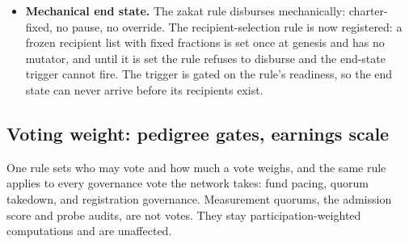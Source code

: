 \documentclass[11pt]{article}
\begin{document}
\begin{itemize}
          spending; it never redirects it. Pace is the only dial.
          Destination is fixed. Silence releases: a scheduled release
          executes when its window closes unless an affirmative negative
          vote at the majority carries; an absence of votes never
          blocks funds. A positive majority releases immediately.
    \item \textbf{Mechanical end state.} The zakat rule disburses
          mechanically: charter-fixed, no pause, no override. The
          recipient-selection rule is now registered: a frozen recipient
          list with fixed fractions is set once at genesis and has no
          mutator, and until it is set the rule refuses to disburse and
          the end-state trigger cannot fire. The trigger is gated on the
          rule's readiness, so the end state can never arrive before its
          recipients exist.
\end{itemize}

\subsection{Voting weight: pedigree gates, earnings scale}

One rule sets who may vote and how much a vote weighs, and the
same rule applies to every governance vote the network takes:
fund pacing, quorum takedown, and registration governance.
Measurement quorums, the admission score and probe audits, are
not votes. They stay participation-weighted computations and are
unaffected.
\end{document}
